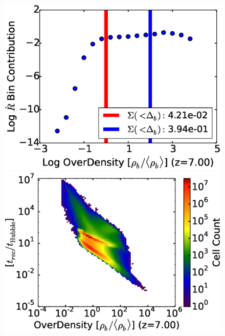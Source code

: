 \begin{figure}[!tp]
\begin{minipage}[h]{0.33\linewidth}
       \includegraphics[trim = 5mm 8mm 0mm 0mm, clip, width=1.0\textwidth]{2_2_HD7900_recomb_contrib_v_OD.eps}
     \end{minipage}
\hspace*{-4.00mm}
    \begin{minipage}[h]{0.33\linewidth}
       \centering
       \includegraphics[trim = 5mm 8mm 0mm 0mm, clip, width=1.0\textwidth]{2_3_HD7900OverDensityRecombHubbleTime.eps}
    \end{minipage}
\\
     \begin{minipage}[h]{0.33\linewidth}
        \centering

\end{minipage}
\end{figure}
